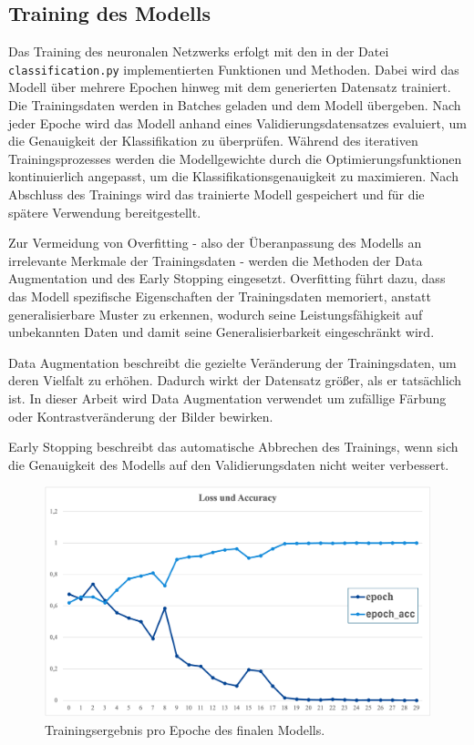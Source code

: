 \documentclass[journal,twoside,web]{ieeecolor}
\begin{document}
\subsection{Training des Modells}
\label{sec:training}
Das Training des neuronalen Netzwerks erfolgt mit den in der Datei \texttt{classification.py} implementierten Funktionen und Methoden. Dabei wird das Modell über mehrere Epochen hinweg mit dem generierten Datensatz trainiert. Die Trainingsdaten werden in Batches geladen und dem Modell übergeben. Nach jeder Epoche wird das Modell anhand eines Validierungsdatensatzes evaluiert, um die Genauigkeit der Klassifikation zu überprüfen. Während des iterativen Trainingsprozesses werden die Modellgewichte durch die Optimierungsfunktionen kontinuierlich angepasst, um die Klassifikationsgenauigkeit zu maximieren. Nach Abschluss des Trainings wird das trainierte Modell gespeichert und für die spätere Verwendung bereitgestellt. 

Zur Vermeidung von Overfitting - also der Überanpassung des Modells an irrelevante Merkmale der Trainingsdaten - werden die Methoden der Data Augmentation und des Early Stopping eingesetzt. Overfitting führt dazu, dass das Modell spezifische Eigenschaften der Trainingsdaten memoriert, anstatt generalisierbare Muster zu erkennen, wodurch seine Leistungsfähigkeit auf unbekannten Daten und damit seine Generalisierbarkeit eingeschränkt wird.

Data Augmentation beschreibt die gezielte Veränderung der Trainingsdaten, um deren Vielfalt zu erhöhen. Dadurch wirkt der Datensatz größer, als er tatsächlich ist. In dieser Arbeit wird Data Augmentation verwendet um zufällige Färbung oder Kontrastveränderung der Bilder bewirken.

Early Stopping beschreibt das automatische Abbrechen des Trainings, wenn sich die Genauigkeit des Modells auf den Validierungsdaten nicht weiter verbessert.


\begin{figure}[H]
    \centerline{\includegraphics[width=\columnwidth]{Trainingslog.png}}
    \caption{Trainingsergebnis pro Epoche des finalen Modells.}
    \label{fig:trainlog}
\end{figure}
\end{document}
